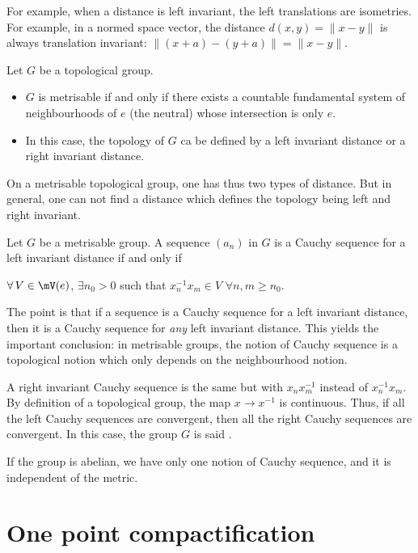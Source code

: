 For example, when a distance is left invariant, the left translations are isometries. For example, in a normed space vector, the distance $d(x,y)=\|x-y\|$ is always translation invariant: $\| (x+a)-(y+a) \|=\|x-y\|$.



\begin{proposition}
    Let $G$ be a topological group.
\begin{itemize}
\item $G$ is metrisable if and only if there exists a countable fundamental system of neighbourhoods of $e$ (the neutral) whose intersection is only $e$.
\item In this case, the topology of $G$ ca be defined by a left invariant distance or a right invariant distance.
\end{itemize}
\end{proposition}




On a metrisable topological group, one has thus two types of distance. But in general, one can not find a distance which defines the topology being left and right invariant.

\begin{proposition}
Let $G$ be a metrisable group. A sequence $(a_n)$ in $G$ is a Cauchy sequence for a left invariant distance if and only if
	
 $\forall\, V\in\mV(e)$, $\exists n_0>0$ such that $x_n^{-1} x_m\in V$ $\forall n,m\geq n_0$.
\label{prop:Cauchy_metrisable}
\end{proposition}

The point is that if a sequence is a Cauchy sequence for a left invariant distance, then it is a Cauchy sequence for \emph{any} left invariant distance. This yields the important conclusion: in metrisable groups, the notion of Cauchy sequence is a topological notion which only depends on the neighbourhood notion.

A right invariant Cauchy sequence is the same but with $x_nx_m^{-1}$ instead of $x_n^{-1} x_m$. By definition of a topological group, the map $x\to x^{-1}$ is continuous. Thus, if all the left Cauchy sequences are convergent, then all the right Cauchy sequences are convergent. In this case, the group $G$ is said .

If the group is abelian, we have only one notion of Cauchy sequence, and it is independent of the metric.

\section{One point compactification}  \label{sec:compactific}


